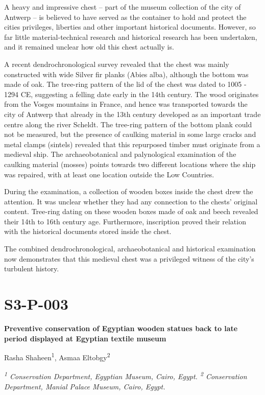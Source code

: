 \documentclass[
]{book}
\begin{document}
A heavy and impressive chest -- part of the museum collection of the city of Antwerp -- is believed to have served as the container to hold and protect the cities privileges, liberties and other important historical documents. However, so far little material-technical research and historical research has been undertaken, and it remained unclear how old this chest actually is.

A recent dendrochronological survey revealed that the chest was mainly constructed with wide Silver fir planks (Abies alba), although the bottom was made of oak. The tree-ring pattern of the lid of the chest was dated to 1005 - 1294 CE, suggesting a felling date early in the 14th century. The wood originates from the Vosges mountains in France, and hence was transported towards the city of Antwerp that already in the 13th century developed as an important trade centre along the river Scheldt. The tree-ring pattern of the bottom plank could not be measured, but the presence of caulking material in some large cracks and metal clamps (sintels) revealed that this repurposed timber must originate from a medieval ship. The archaeobotanical and palynological examination of the caulking material (mosses) points towards two different locations where the ship was repaired, with at least one location outside the Low Countries.

During the examination, a collection of wooden boxes inside the chest drew the attention. It was unclear whether they had any connection to the chests' original content. Tree-ring dating on these wooden boxes made of oak and beech revealed their 14th to 16th century age. Furthermore, inscription proved their relation with the historical documents stored inside the chest.

The combined dendrochronological, archaeobotanical and historical examination now demonstrates that this medieval chest was a privileged witness of the city's turbulent history.

\hypertarget{s3-p-003}{%
\section*{S3-P-003}\label{s3-p-003}}

\textbf{Preventive conservation of Egyptian wooden statues back to late period displayed at Egyptian textile museum}

Rasha Shaheen\textsuperscript{1}, Asmaa Eltobgy\textsuperscript{2}

\emph{\textsuperscript{1} Conservation Department, Egyptian Museum, Cairo, Egypt. \textsuperscript{2} Conservation Department, Manial Palace Museum, Cairo, Egypt.}
\end{document}
